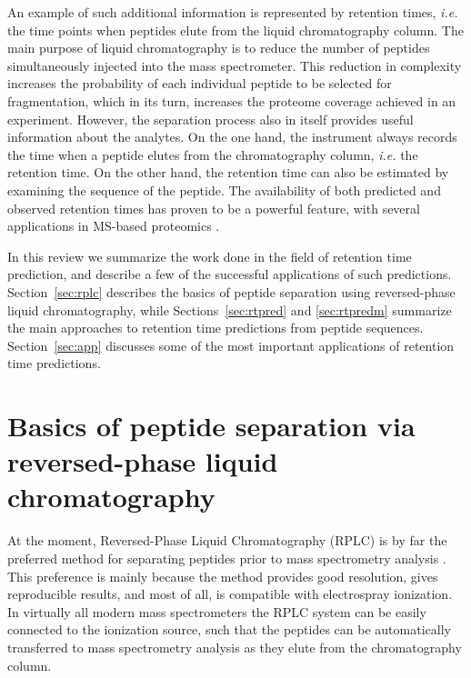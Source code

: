 \documentclass[a4paper]{article}
\begin{document}
An example of such additional information is represented by retention
times, {\em i.e.} the time points when peptides elute from the liquid
chromatography column.  The main purpose of liquid chromatography is
to reduce the number of peptides simultaneously injected into the mass
spectrometer. This reduction in complexity increases the probability
of each individual peptide to be selected for fragmentation, which in
its turn, increases the proteome coverage achieved in an experiment.
However, the separation process also in itself provides useful
information about the analytes. On the one hand, the instrument always
records the time when a peptide elutes from the chromatography column,
{\em i.e.}  the retention time. On the other hand, the retention time
can also be estimated by examining the sequence of the peptide. The
availability of both predicted and observed retention times has proven
to be a powerful feature, with several applications in MS-based
proteomics \cite{Palmblad2013}.

In this review we summarize the work done in the field of retention
time prediction, and describe a few of the successful applications of
such predictions. Section~\ref{sec:rplc} describes the basics of
peptide separation using reversed-phase liquid chromatography, while
Sections~\ref{sec:rtpred} and \ref{sec:rtpredm} summarize the main
approaches to retention time predictions from peptide
sequences. Section~\ref{sec:app} discusses some of the most important
applications of retention time predictions.




\section{\label{sec:rplc}Basics of peptide separation via reversed-phase liquid chromatography}

At the moment, Reversed-Phase Liquid Chromatography (RPLC) is by far
the preferred method for separating peptides prior to mass
spectrometry analysis \cite{Xie201278}. This preference is mainly
because the method provides good resolution, gives reproducible
results, and most of all, is compatible with electrospray
ionization. In virtually all modern mass spectrometers the RPLC system
can be easily connected to the ionization source, such that the
peptides can be automatically transferred to mass spectrometry
analysis as they elute from the chromatography column.
\end{document}
